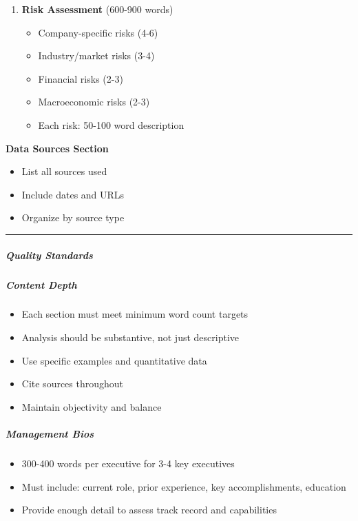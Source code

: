 \documentclass[11pt]{article}
\begin{document}
\begin{enumerate}[leftmargin=*,itemsep=2pt,topsep=2pt]
\begin{itemize}[leftmargin=*,itemsep=2pt,topsep=2pt]
\item {} Penetration strategy
\end{itemize}
\item {} \textbf{Risk Assessment} (600-900 words)
\begin{itemize}[leftmargin=*,itemsep=2pt,topsep=2pt]
\item {} Company-specific risks (4-6)
\item {} Industry/market risks (3-4)
\item {} Financial risks (2-3)
\item {} Macroeconomic risks (2-3)
\item {} Each risk: 50-100 word description
\end{itemize}
\end{enumerate}

\textbf{Data Sources Section}

\begin{itemize}[leftmargin=*,itemsep=2pt,topsep=2pt]
\item {} List all sources used
\item {} Include dates and URLs
\item {} Organize by source type
\end{itemize}

\vspace{0.5em}\hrule\vspace{0.5em}

\subparagraph{Quality Standards}\mbox{}\par

\subparagraph{Content Depth}\mbox{}\par
\begin{itemize}[leftmargin=*,itemsep=2pt,topsep=2pt]
\item {} Each section must meet minimum word count targets
\item {} Analysis should be substantive, not just descriptive
\item {} Use specific examples and quantitative data
\item {} Cite sources throughout
\item {} Maintain objectivity and balance
\end{itemize}

\subparagraph{Management Bios}\mbox{}\par
\begin{itemize}[leftmargin=*,itemsep=2pt,topsep=2pt]
\item {} 300-400 words per executive for 3-4 key executives
\item {} Must include: current role, prior experience, key accomplishments, education
\item {} Provide enough detail to assess track record and capabilities
\end{itemize}
\end{document}
